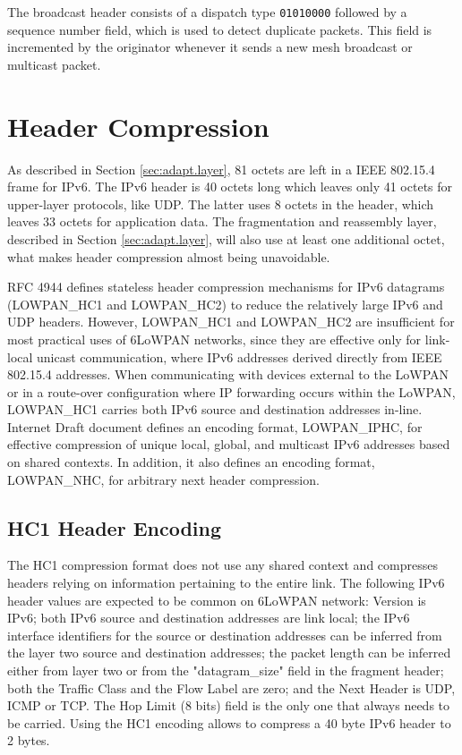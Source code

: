 \documentclass[12pt, titlepage, a4paper]{report}
\begin{document}
The broadcast header consists of a dispatch type \texttt{01010000} followed by a sequence number field, which is used to detect duplicate packets.
This field is incremented by the originator whenever it sends a new mesh broadcast or multicast packet.

\section{Header Compression}\label{sec:hc}
As described in Section \ref{sec:adapt.layer}, 81 octets are left in a IEEE 802.15.4 frame for IPv6. The IPv6 header is 40 octets long which leaves only 41 octets for upper-layer protocols, like UDP.  The latter uses 8 octets in the header, which leaves 33 octets for application data. 
The fragmentation and reassembly layer, described in Section \ref{sec:adapt.layer}, will also use at least one additional octet, what makes header compression almost being unavoidable.  

RFC 4944 \cite{rfc4944} defines stateless header compression mechanisms for IPv6 datagrams (LOWPAN\_HC1 and LOWPAN\_HC2) to reduce the relatively large IPv6 and UDP headers. However, LOWPAN\_HC1 and LOWPAN\_HC2 are insufficient for most practical uses of 6LoWPAN networks, since they are effective only for link-local unicast communication, where IPv6 addresses derived directly from IEEE 802.15.4 addresses. When communicating with devices external to the LoWPAN or in a route-over configuration where IP forwarding occurs within the LoWPAN, LOWPAN\_HC1 carries both IPv6 source and destination addresses in-line. Internet Draft document \cite{draft-hc-06} defines an encoding format, LOWPAN\_IPHC, for effective compression of unique local, global, and multicast IPv6 addresses based on shared contexts. In addition, it also defines an encoding format, LOWPAN\_NHC, for arbitrary next header compression.

\subsection{HC1 Header Encoding}
The HC1 compression format does not use any shared context and compresses headers relying on information pertaining to the entire link. The following IPv6 header values are expected to be common on 6LoWPAN network: Version is IPv6; both IPv6 source and destination addresses are link local;  the IPv6 interface identifiers for the source or destination addresses can be inferred from the layer two source and destination addresses; the packet length can be inferred either from layer two or from the "datagram\_size" field in the fragment header; both the Traffic Class and the Flow Label are zero; and the Next Header is UDP, ICMP or TCP. The Hop Limit (8 bits) field is the only one that always needs to be carried. Using the HC1 encoding allows to compress a 40 byte IPv6 header to 2 bytes.
\end{document}
